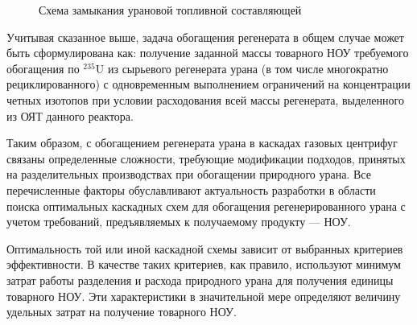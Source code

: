 \begin{figure}[ht]
  \caption{Схема замыкания урановой топливной составляющей}\label{reconeto}
\end{figure}

Учитывая сказанное выше, задача обогащения регенерата в общем случае может быть сформулирована как: получение заданной массы товарного НОУ требуемого обогащения по $^{235}$U из сырьевого регенерата урана (в том числе многократно рециклированного) с одновременным выполнением ограничений на концентрации четных изотопов при условии расходования всей массы регенерата, выделенного из ОЯТ данного реактора.

Таким образом, с обогащением регенерата урана в каскадах газовых центрифуг связаны определенные сложности, требующие модификации подходов, принятых на разделительных производствах при обогащении природного урана. Все перечисленные факторы обуславливают актуальность разработки в области поиска оптимальных каскадных схем для обогащения регенерированного урана с учетом требований, предъявляемых к получаемому продукту --- НОУ.

Оптимальность той или иной каскадной схемы зависит от выбранных критериев эффективности. В качестве таких критериев, как правило, используют минимум затрат работы разделения и расхода природного урана для получения единицы товарного НОУ. Эти характеристики в значительной мере определяют величину удельных затрат на получение товарного НОУ.


